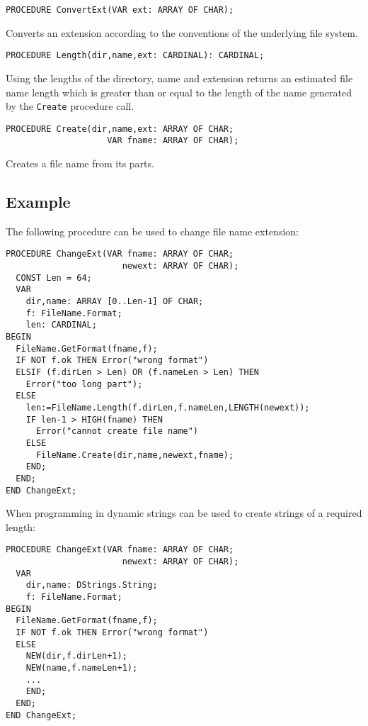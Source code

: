 {\samepage
{}
\begin{verbatim}
PROCEDURE ConvertExt(VAR ext: ARRAY OF CHAR);
\end{verbatim}
}
\ModuleList
Converts an extension according to the conventions of
the underlying file system.

{\samepage
{}
\begin{verbatim}
PROCEDURE Length(dir,name,ext: CARDINAL): CARDINAL;
\end{verbatim}
}
\ModuleList
Using the lengths of the directory, name and extension returns
an estimated file name length which is greater than or equal to
the length of the name generated by the {\tt Create} procedure call.

{\samepage
{}
\begin{verbatim}
PROCEDURE Create(dir,name,ext: ARRAY OF CHAR;
                    VAR fname: ARRAY OF CHAR);
\end{verbatim}
}
\ModuleList
Creates a file name from its parts.

\subsection{Example}

The following procedure can be used to change file name
extension:
\begin{verbatim}
PROCEDURE ChangeExt(VAR fname: ARRAY OF CHAR;
                       newext: ARRAY OF CHAR);
  CONST Len = 64;
  VAR
    dir,name: ARRAY [0..Len-1] OF CHAR;
    f: FileName.Format;
    len: CARDINAL;
BEGIN
  FileName.GetFormat(fname,f);
  IF NOT f.ok THEN Error("wrong format")
  ELSIF (f.dirLen > Len) OR (f.nameLen > Len) THEN
    Error("too long part");
  ELSE
    len:=FileName.Length(f.dirLen,f.nameLen,LENGTH(newext));
    IF len-1 > HIGH(fname) THEN
      Error("cannot create file name")
    ELSE
      FileName.Create(dir,name,newext,fname);
    END;
  END;
END ChangeExt;
\end{verbatim}

When programming in \ot{} dynamic strings can be used to
create strings of a required length:
\begin{verbatim}
PROCEDURE ChangeExt(VAR fname: ARRAY OF CHAR;
                       newext: ARRAY OF CHAR);
  VAR
    dir,name: DStrings.String;
    f: FileName.Format;
BEGIN
  FileName.GetFormat(fname,f);
  IF NOT f.ok THEN Error("wrong format")
  ELSE
    NEW(dir,f.dirLen+1);
    NEW(name,f.nameLen+1);
    ...
    END;
  END;
END ChangeExt;
\end{verbatim}

